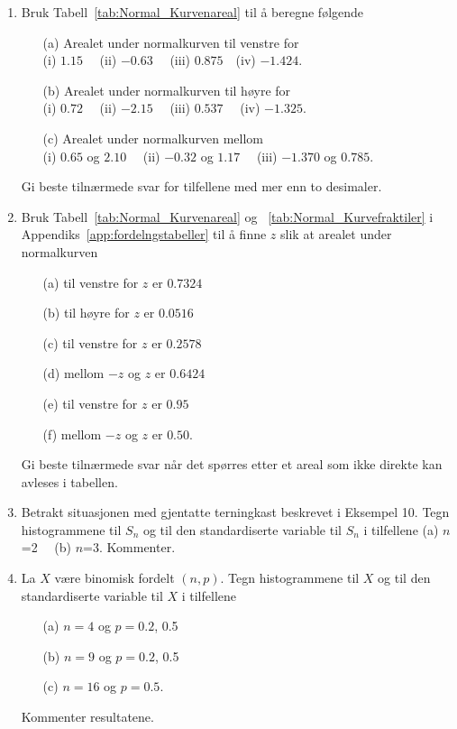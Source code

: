 \begin{enumerate}
\item  Bruk Tabell~\ref{tab:Normal_Kurvenareal} til å beregne følgende
     \begin{itemize} 
    \item[(a)]  Arealet under normalkurven til venstre for  \\
          (i) $1.15$ \ \ (ii) $-0.63$ \ \ (iii) $0.875$\ \  (iv) $-1.424$.
     \item[(b)]  Arealet under normalkurven til høyre for \\
          (i) $0.72$ \ \ (ii) $-2.15$ \ \ (iii) $0.537$ \ \ (iv) $-1.325$.
     \item[(c)]  Arealet under normalkurven mellom \\
          (i) $0.65$ og $2.10$ \ \   (ii) $-0.32$ og $1.17$ \ \ 
          (iii) $-1.370$ og $0.785$.
     \end{itemize}
     Gi beste tilnærmede svar for tilfellene med mer enn to desimaler.

\item  Bruk Tabell~\ref{tab:Normal_Kurvenareal} og ~\ref{tab:Normal_Kurvefraktiler} i Appendiks~\ref{app:fordelngstabeller} til å finne $z$ slik at arealet under
     normalkurven
     \begin{itemize}
     \item[(a)]  til venstre for $z$ er $0.7324$
     \item[(b)]  til høyre for $z$ er $0.0516$
     \item[(c)]  til venstre for $z$ er $0.2578$     
     \item[(d)]  mellom $-z$ og $z$ er $0.6424$
     \item[(e)]  til venstre for $z$ er $0.95$
     \item[(f)]  mellom $-z$ og $z$ er $0.50$.
     \end{itemize}
     Gi beste tilnærmede svar når det spørres
     etter et areal som ikke direkte kan avleses i tabellen.


\item  Betrakt situasjonen med gjentatte terningkast beskrevet i
     Eksempel 10. Tegn histogrammene til $S_n$ og til den
     standardiserte variable til $S_n$ i tilfellene (a) $n$=2 \ \ (b)  $n$=3.
     Kommenter.

\item La $X$ være binomisk fordelt $(n,p)$. Tegn histogrammene til
     $X$ og til den standardiserte variable til $X$ i tilfellene 
     \begin{itemize}
     \item[(a)]  $n=4$   og   $p=0.2$, 0.5
     \item[(b)]  $n=9$   og   $p=0.2$, 0.5
     \item[(c)]  $n=16$  og   $p=0.5$.
     \end{itemize}
     Kommenter resultatene.


\end{enumerate}
